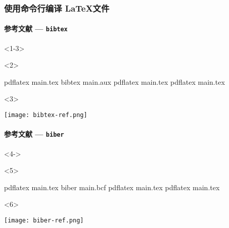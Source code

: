 \begin{frame}[fragile, t]
  \frametitle{使用命令行编译 \LaTeX 文件}
  \framesubtitle<1-3>{参考文献 --- \texttt{bibtex}}


\begin{onlyenv}<1-3>
\end{onlyenv}

\begin{onlyenv}<2>
\begin{cmdcode}
pdflatex main.tex
bibtex main.aux
pdflatex main.tex
pdflatex main.tex
\end{cmdcode}  
\end{onlyenv}

\begin{onlyenv}<3>
  \begin{center}
    \texttt{[image: bibtex-ref.png]}
  \end{center}
\end{onlyenv}

\framesubtitle<4->{参考文献 --- \texttt{biber}}

\begin{onlyenv}<4->
\end{onlyenv}

\begin{onlyenv}<5>
\begin{cmdcode}
pdflatex main.tex
biber main.bcf
pdflatex main.tex
pdflatex main.tex
\end{cmdcode}
\end{onlyenv}

\begin{onlyenv}<6>
  \begin{center}
    \texttt{[image: biber-ref.png]}
  \end{center}
\end{onlyenv}

\end{frame}

